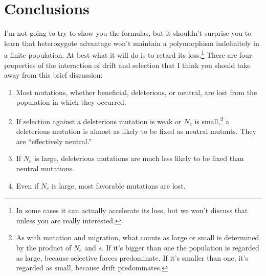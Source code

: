 \section*{Conclusions}

I'm not going to try to show you the formulas, but it shouldn't
surprise you to learn that heterozygote advantage won't maintain a
polymorphism indefinitely in a finite population. At best what it will
do is to retard its loss.\footnote{In some cases it can actually
  accelerate its loss, but we won't discuss that unless you are really
  interested.}  There are four properties of the interaction of drift
and selection that I think you should take away from this brief
discussion:

\begin{enumerate}

\item Most mutations, whether beneficial, deleterious, or neutral, are
  lost from the population in which they occurred.

\item If selection against a deleterious mutation is weak or $N_e$ is
  small,\footnote{As with mutation and migration, what counts as large
    or small is determined by the product of $N_e$ and $s$. If it's
    bigger than one the population is regarded as large, because
    selective forces predominate. If it's smaller than one, it's
    regarded as small, because drift predominates.} a deleterious
  mutation is almost as likely to be fixed as neutral mutants. They
  are ``effectively neutral.''

\item If $N_e$ is large, deleterious mutations are much less likely to
  be fixed than neutral mutations.

\item Even if $N_e$ is large, most favorable mutations are lost.

\end{enumerate}

